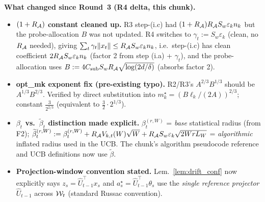 \textbf{What changed since Round~3 (R4 delta, this chunk).}
\begin{itemize}[leftmargin=*,itemsep=1pt,topsep=1pt]
\item \textbf{$(1+R_{\mathcal{A}})$ constant cleaned up.} R3 step-(i.c) had
  $(1+R_{\mathcal{A}})R_{\mathcal{A}} S_w\varepsilon_k n_k$ but the probe-allocation $B$ was
  not updated. R4 switches to $\gamma_t := S_w\varepsilon_k$ (clean, no
  $R_{\mathcal{A}}$ needed), giving $\sum_t\gamma_t\|x_t\|\le R_{\mathcal{A}} S_w\varepsilon_k n_k$,
  i.e.\ step-(i.c) has clean coefficient $2R_{\mathcal{A}} S_w\varepsilon_k n_k$ (factor
  2 from step (i.a) + $\gamma_t$), and the probe-allocation uses
  $B := 4C_{\mathrm{sub}} S_w R_{\mathcal{A}}\sqrt{\log(2d/\delta)}$ (absorbs factor 2).
\item \textbf{opt\_mk exponent fix (pre-existing typo).} R2/R3's
  $A^{2/3}B^{1/3}$ should be $A^{1/3}B^{2/3}$. Verified by direct
  substitution into $m_k^\star=(B\ell_k/(2A))^{2/3}$; constant
  $\tfrac{3}{2^{2/3}}$ (equivalent to $\tfrac32\cdot 2^{1/3}$).
\item \textbf{$\beta_t$ vs.\ $\widetilde\beta_t$ distinction made explicit.}
  $\beta_t^{(r,W)}$ = \emph{base} statistical radius (from F2);
  $\widetilde\beta_t^{(r,W)} := \beta_t^{(r,W)}+R_{\mathcal{A}} V_{k,t}(W)\sqrt W+R_{\mathcal{A}} S_w\varepsilon_k\sqrt{2WrL_W}$
  = \emph{algorithmic} inflated radius used in the UCB. The chunk's
  algorithm pseudocode reference and UCB definitions now use $\widetilde\beta$.
\item \textbf{Projection-window convention stated.} Lem.~\ref{lem:drift_conf}
  now explicitly says $z_s=\widehat U_{t-1}^\top x_s$ and
  $a_s^\star=\widehat U_{t-1}^\top\theta_s$ use the \emph{single
  reference projector} $\widehat U_{t-1}$ across $\mathcal{W}_t$ (standard
  Russac convention).
\end{itemize}

